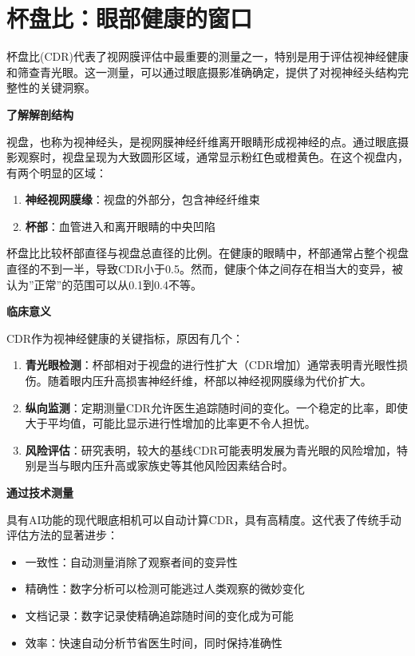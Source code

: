 \documentclass[
  Letterpaper,
]{scrbook}
\providecommand{\tightlist}{%
  \setlength{\itemsep}{0pt}\setlength{\parskip}{0pt}}\usepackage{longtable,booktabs,array}
\begin{document}
\section{杯盘比：眼部健康的窗口}\label{ux676fux76d8ux6bd4ux773cux90e8ux5065ux5eb7ux7684ux7a97ux53e3}

杯盘比(CDR)代表了视网膜评估中最重要的测量之一，特别是用于评估视神经健康和筛查青光眼。这一测量，可以通过眼底摄影准确确定，提供了对视神经头结构完整性的关键洞察。

\textbf{了解解剖结构}

视盘，也称为视神经头，是视网膜神经纤维离开眼睛形成视神经的点。通过眼底摄影观察时，视盘呈现为大致圆形区域，通常显示粉红色或橙黄色。在这个视盘内，有两个明显的区域：

\begin{enumerate}
\def\labelenumi{\arabic{enumi}.}
\tightlist
\item
  \textbf{神经视网膜缘}：视盘的外部分，包含神经纤维束
\item
  \textbf{杯部}：血管进入和离开眼睛的中央凹陷
\end{enumerate}

杯盘比比较杯部直径与视盘总直径的比例。在健康的眼睛中，杯部通常占整个视盘直径的不到一半，导致CDR小于0.5。然而，健康个体之间存在相当大的变异，被认为''正常''的范围可以从0.1到0.4不等。

\textbf{临床意义}

CDR作为视神经健康的关键指标，原因有几个：

\begin{enumerate}
\def\labelenumi{\arabic{enumi}.}
\tightlist
\item
  \textbf{青光眼检测}：杯部相对于视盘的进行性扩大（CDR增加）通常表明青光眼性损伤。随着眼内压升高损害神经纤维，杯部以神经视网膜缘为代价扩大。
\item
  \textbf{纵向监测}：定期测量CDR允许医生追踪随时间的变化。一个稳定的比率，即使大于平均值，可能比显示进行性增加的比率更不令人担忧。
\item
  \textbf{风险评估}：研究表明，较大的基线CDR可能表明发展为青光眼的风险增加，特别是当与眼内压升高或家族史等其他风险因素结合时。
\end{enumerate}

\textbf{通过技术测量}

具有AI功能的现代眼底相机可以自动计算CDR，具有高精度。这代表了传统手动评估方法的显著进步：

\begin{itemize}
\tightlist
\item
  一致性：自动测量消除了观察者间的变异性
\item
  精确性：数字分析可以检测可能逃过人类观察的微妙变化
\item
  文档记录：数字记录使精确追踪随时间的变化成为可能
\item
  效率：快速自动分析节省医生时间，同时保持准确性
\end{itemize}
\end{document}
